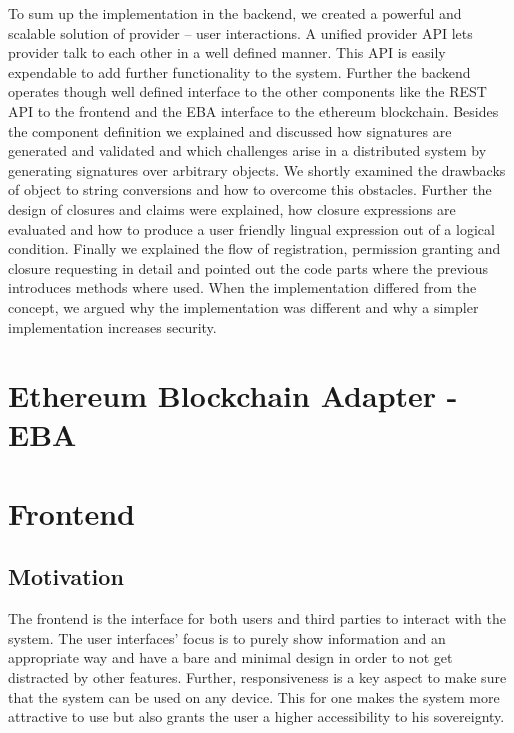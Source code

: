 To sum up the implementation in the backend, we created a powerful and scalable solution of provider – user interactions. A unified provider API lets provider talk to each other in a well defined manner. This API is easily expendable to add further functionality to the system. Further the backend operates though well defined interface to the other components like the REST API to the frontend and the EBA interface to the ethereum blockchain. Besides the component definition we explained and discussed how signatures are generated and validated and which challenges arise in a distributed system by generating signatures over arbitrary objects.  We shortly examined the drawbacks of object to string conversions and how to overcome this obstacles. Further the design of closures and claims were explained, how closure expressions are evaluated and how to produce a user friendly lingual expression out of a logical condition. Finally we explained the flow of registration, permission granting and closure requesting in detail and pointed out the code parts where the previous introduces methods where used. When the implementation differed from the concept, we argued why the implementation was different and why a simpler implementation increases security. 


\section{Ethereum Blockchain Adapter - EBA}
\label{sec:eba}


\section{Frontend}
\label{sec:frontend}


\subsection{Motivation}

The frontend is the interface for both users and third parties to interact with the system.
The user interfaces' focus is to purely show information and an appropriate way and have a bare and minimal design
in order to not get distracted by other features.
Further, responsiveness is a key aspect to make sure that the system can be used on any device. This for one makes the
system more attractive to use but also grants the user a higher accessibility to his sovereignty.

